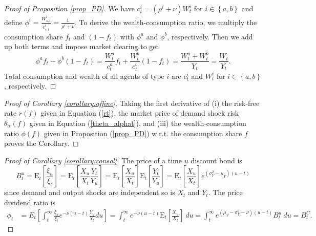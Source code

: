 \documentclass[preprint,11pt,authoryear]{elsarticle}
\theoremstyle{plain}
\begin{document}
\begin{proof}[Proof of Proposition \ref{prop_PD}]
We have $c^i_t = \left(\rho^i + \nu\right) W^i_t$ for $i \in \left\{a,b\right\}$ and define $\phi^i = \frac{W^i_{s,t}}{c^i_{s,t}} = \frac{1}{\rho^i + \nu}$. To derive the wealth-consumption ratio, we multiply the consumption share $f_{t}$ and $(1-f_t)$ with $\phi^{a}$ and $\phi^{b}$, respectively. Then we add up both terms and impose market clearing to get
\begin{equation}
    \phi^{a} f_t + \phi^{b}\left(1-f_t\right) = \frac{W^a_t}{c^a_t}f_t + \frac{W^b_t}{c^b_t}\left(1-f_t\right) = \frac{W^a_t + W^b_t}{Y_t} = \frac{W_t}{Y_t}.
\end{equation}
Total consumption and wealth of all agents of type $i$ are $c^i_t$ and $W^i_t$ for $i \in \left\{a,b\right\}$, respectively.
\end{proof}
\begin{proof}[Proof of Corollary \ref{corollary:affine}]
Taking the first derivative of (i) the risk-free rate $r(f)$ given in Equation (\ref{rt}), the market price of demand shock risk $\theta_{\alpha}(f)$ given in Equation (\ref{theta_alphat}), and (iii) the wealth-consumption ratio $\phi(f)$ given in Proposition (\ref{prop_PD}) w.r.t. the consumption share $f$ proves the Corollary. 
\end{proof}
\begin{proof}[Proof of Corollary \ref{corollary:consol}]
The price of a time $u$ discount bond is
%
\begin{equation*}
    B_t^u = \mathrm{E}_t \left [ \frac{\xi_u}{\xi_t} \right] = \mathrm{E}_t \left [ \frac{X_u}{X_t} \frac{Y_t}{Y_u}\right] =  \mathrm{E}_t \left [ \frac{X_u}{X_t}\right]\mathrm{E}_t \left [ \frac{Y_t}{Y_u}\right] =
     \mathrm{E}_t \left [ \frac{X_u}{X_t}\right] e^{\left( \sigma_Y^2 - \mu_Y\right) (u-t)} 
\end{equation*}
%
since demand and output shocks are independent so is $X_t$ and $Y_t$. The price dividend ratio is
%
\begin{equation}
    \begin{split}
    \phi_t &=  E_t\left[\int_{t}^{\infty} \frac{\xi_{u}}{\xi_t}e^{-\nu\left(u-t\right)}\frac{Y_u}{Y_t}du\right]  
    = \int_{t}^{\infty}   e^{-\nu\left(u-t\right)}  \mathrm{E}_t \left [ \frac{X_u}{X_t}\right] \: du 
    = \int_{t}^{\infty}   e^{\left(\mu_Y - \sigma_Y^2 - \nu \right)\left(u-t\right)}   B_t^u  \: du = B_t^C. 
\end{split}
\end{equation}
%
\end{proof}
\end{document}
